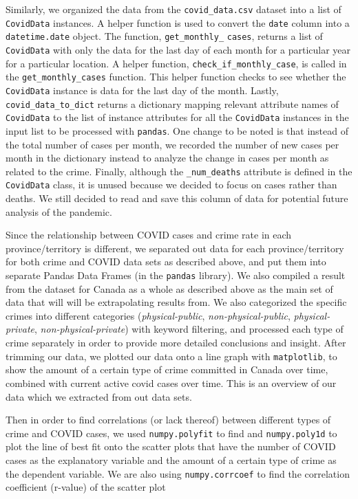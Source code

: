 \documentclass[fontsize=11pt]{article}
\begin{document}
Similarly, we organized the data from the \verb+covid_data.csv+ dataset into a list of \verb+CovidData+ instances. A helper function is used to convert the \verb+date+ column into a \verb+datetime.date+ object. The function, \verb+get_monthly_+ \verb+cases+, returns a list of \verb+CovidData+ with only the data for the last day of each month for a particular year for a particular location. A helper function, \verb+check_if_monthly_case+, is called in the \verb+get_monthly_cases+ function. This helper function checks to see whether the \verb+CovidData+ instance is data for the last day of the month. Lastly, \verb+covid_data_to_dict+ returns a dictionary mapping relevant attribute names of \verb+CovidData+ to the list of instance attributes for all the \verb+CovidData+ instances in the input list to be processed with \verb+pandas+. One change to be noted is that instead of the total number of cases per month, we recorded the number of new cases per month in the dictionary instead to analyze the change in cases per month as related to the crime. Finally, although the \verb+_num_deaths+ attribute is defined in the \verb+CovidData+ class, it is unused because we decided to focus on cases rather than deaths. We still decided to read and save this column of data for potential future analysis of the pandemic.

Since the relationship between COVID cases and crime rate in each province/territory is different, we separated out data for each province/territory for both crime and COVID data sets as described above, and put them into separate Pandas Data Frames (in the \verb+pandas+ library). We also compiled a result from the dataset for Canada as a whole as described above as the main set of data that will will be extrapolating results from. We also categorized the specific crimes into different categories (\textit{physical-public}, \textit{non-physical-public}, \textit{physical-private}, \textit{non-physical-private}) with keyword filtering, and processed each type of crime separately in order to provide more detailed conclusions and insight. After trimming our data, we plotted our data onto a line graph with \verb+matplotlib+, to show the amount of a certain type of crime committed in Canada over time, combined with current active covid cases over time. This is an overview of our data which we extracted from out data sets.

Then in order to find correlations (or lack thereof) between different types of crime and COVID cases, we used \verb+numpy.polyfit+ to find and \verb+numpy.poly1d+ to plot the line of best fit onto the scatter plots that have the number of COVID cases as the explanatory variable and the amount of a certain type of crime as the dependent variable. We are also using \verb+numpy.corrcoef+ to find the correlation coefficient (r-value) of the scatter plot 
\end{document}
